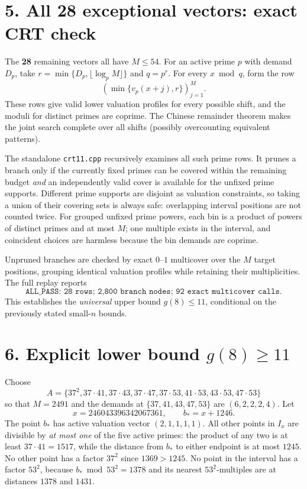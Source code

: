 \documentclass[11pt,a4paper]{article}
\newcommand{\val}{v}
\begin{document}
\section*{5. All 28 exceptional vectors: exact CRT check}
The \textbf{28} remaining vectors all have $M\le54$. For an active prime $p$ with demand $D_p$, take $r=\min\{D_p,\lfloor\log_p M\rfloor\}$ and $q=p^r$. For every $x\bmod q$, form the row
\[
 \left(\min\{\val_p(x+j),r\}\right)_{j=1}^M.
\]
These rows give valid lower valuation profiles for every possible shift, and the moduli for distinct primes are coprime. The Chinese remainder theorem makes the joint search complete over all shifts (possibly overcounting equivalent patterns).

The standalone \texttt{crt11.cpp} recursively examines all such prime rows. It prunes a branch only if the currently fixed primes can be covered within the remaining budget \emph{and} an independently valid cover is available for the unfixed prime supports. Different prime supports are disjoint as valuation constraints, so taking a union of their covering sets is always safe: overlapping interval positions are not counted twice. For grouped unfixed prime powers, each bin is a product of powers of distinct primes and at most $M$; one multiple exists in the interval, and coincident choices are harmless because the bin demands are coprime.

Unpruned branches are checked by exact $0$--$1$ multicover over the $M$ target positions, grouping identical valuation profiles while retaining their multiplicities. The full replay reports
\[
 \boxed{\texttt{ALL\_PASS: 28 rows; 2,800 branch nodes; 92 exact multicover calls.}}
\]
This establishes the \emph{universal} upper bound $g(8)\le11$, conditional on the previously stated small-$n$ bounds.

\clearpage
\section*{6. Explicit lower bound $g(8)\ge11$}
Choose
\[
 A=\{37^2,37\cdot41,37\cdot43,37\cdot47,37\cdot53,41\cdot53,43\cdot53,47\cdot53\}
\]
so that $M=2491$ and the demands at $\{37,41,43,47,53\}$ are $(6,2,2,2,4)$. Let
\[
 x=246043396342067361,\qquad b_*=x+1246.
\]
The point $b_*$ has active valuation vector $(2,1,1,1,1)$. All other points in $I_x$ are divisible by \emph{at most one} of the five active primes: the product of any two is at least $37\cdot41=1517$, while the distance from $b_*$ to either endpoint is at most $1245$. No other point has a factor $37^2$ since $1369>1245$. No point in the interval has a factor $53^2$, because $b_*\bmod53^2=1378$ and its nearest $53^2$-multiples are at distances $1378$ and $1431$.
\end{document}
